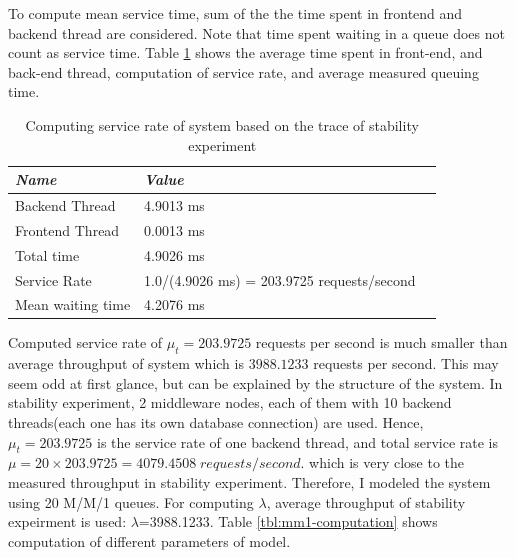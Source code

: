 \documentclass[11pt]{article}
\begin{document}
To compute mean service time, sum of the the time spent in frontend and backend thread are considered.
Note that time spent waiting in a queue does not count as service time. Table \ref{tbl:mm1-service-time}
shows the average time spent in front-end, and back-end thread, computation of service rate, and average
measured queuing time.

\begin{table}[!ht]
  \begin{tabular}{*3l}    \toprule
    \emph{Name}   & \emph{Value} \\
    \hline
      Backend Thread     & 4.9013 ms \\
      Frontend Thread    & 0.0013 ms \\
      Total time         & 4.9026 ms \\
    \hline
      Service Rate       & 1.0/(4.9026 ms) = 203.9725 requests/second \\
      Mean waiting time  & 4.2076 ms \\ 
    \hline
  \end{tabular}
  \centering
  \caption{Computing service rate of system based on the trace of stability experiment}
  \label{tbl:mm1-service-time}
\end{table}

Computed service rate of $\mu_t=203.9725$ requests per second is much 
smaller than average throughput of system which is $3988.1233$ requests per second. 
This may seem odd at first glance, but can be explained by the structure of the system. In stability experiment, 2 middleware nodes, each of them 
with 10 backend threads(each one has its own database connection) are used. 
Hence, $\mu_t=203.9725$ is the service rate of one backend thread, and total service rate 
is $\mu = 20 \times 203.9725 = 4079.4508 \; requests/second$. which is very 
close to the measured throughput in stability experiment. Therefore, I modeled the system
using 20 M/M/1 queues. For computing $\lambda$, average throughput of stability expeirment is used: $\lambda$=3988.1233.
Table \ref{tbl:mm1-computation} shows computation of different parameters of model.
\end{document}
